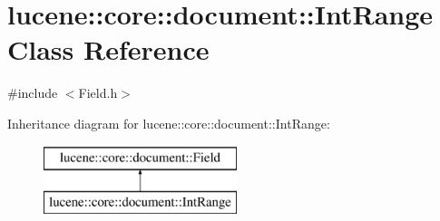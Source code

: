 \hypertarget{classlucene_1_1core_1_1document_1_1IntRange}{}\section{lucene\+:\+:core\+:\+:document\+:\+:Int\+Range Class Reference}
\label{classlucene_1_1core_1_1document_1_1IntRange}


{\ttfamily \#include $<$Field.\+h$>$}

Inheritance diagram for lucene\+:\+:core\+:\+:document\+:\+:Int\+Range\+:\begin{figure}[H]
\begin{center}
\leavevmode
\includegraphics[height=2.000000cm]{classlucene_1_1core_1_1document_1_1IntRange}
\end{center}
\end{figure}
